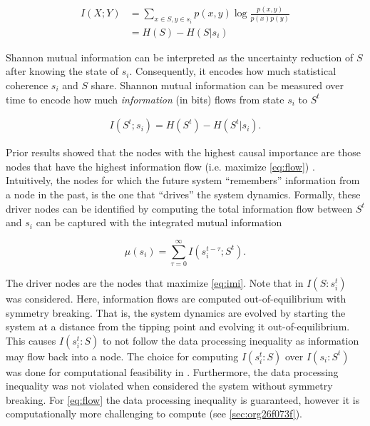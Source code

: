 \documentclass[a4paper, 11pt, twocolumn]{article}
\begin{document}
\begin{equation}
\begin{aligned}
I(X; Y) &= \sum_{x\in S, y \in s_i} p(x,y) \log \frac{p(x,y)}{p(x)p(y)}\\
        &= H(S) - H(S | s_i)
\end{aligned}
\end{equation}

Shannon  mutual   information  can  be  interpreted   as  the
uncertainty reduction of $S$ after knowing the state of $s_i$.
Consequently, it encodes how  much statistical coherence $s_i$
and $S$ share.  Shannon mutual  information can be
measured over time to  encode how  much \emph{information} (in  bits) flows
from state $s_i$ to $S^{t}$

\begin{equation}
\label{eq:flow}
\begin{aligned}
I(S^t; s_i) = H(S^t) - H(S^t | s_i).
\end{aligned}
\end{equation}


Prior results showed that the  nodes with the highest causal
importance are those nodes that have the highest information
flow   (i.e.   maximize  \ref{eq:flow})   \cite{vanElteren2022}.
Intuitively,  the   nodes  for   which  the   future  system
``remembers'' information from a node  in the past, is the one
that ``drives''  the system  dynamics. Formally,  these driver
nodes can  be identified by computing  the total information
flow  between  $S^t$ and  $s_i$  can  be captured  with  the
integrated mutual information \cite{vanElteren2021}

\begin{equation}
\label{eq:imi}
\mu(s_i) = \sum_{\tau = 0}^{\infty} I(s_{i}^{t-\tau} ; S^t).
\end{equation}

The  driver nodes  are the  nodes that  maximize \ref{eq:imi}.
Note  that  in  \cite{vanElteren2022}  $I(S  :  s_i^{t})$  was
considered.   Here,    information   flows    are   computed
out-of-equilibrium  with  symmetry  breaking. That  is,  the
system  dynamics are  evolved by  starting the  system at  a
distance   from   the   tipping  point   and   evolving   it
out-of-equilibrium. This causes $I(s_i^t : S)$ to not follow
the data processing inequality  as information may flow back
into a  node. The choice  for computing $I(s_i^t :  S)$ over
$I(s_i  : S^t)$  was done  for computational  feasibility in
\cite{vanElteren2022}.   Furthermore,   the  data   processing
inequality  was  not  violated when  considered  the  system
without   symmetry  breaking.   For  \ref{eq:flow}   the  data
processing   inequality  is   guaranteed,   however  it   is
computationally more challenging to compute (see \ref{sec:org26f073f}).
\end{document}
